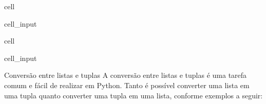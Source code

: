 \documentclass[letterpaper,10pt,english]{jupyterBook}
\begin{document}
\begin{sphinxuseclass}{cell}\begin{sphinxVerbatimInput}

\begin{sphinxuseclass}{cell_input}
\begin{sphinxVerbatim}[commandchars=\\\{\}]
  
  
\end{sphinxVerbatim}

\end{sphinxuseclass}\end{sphinxVerbatimInput}

\end{sphinxuseclass}
\begin{sphinxuseclass}{cell}\begin{sphinxVerbatimInput}

\begin{sphinxuseclass}{cell_input}
\begin{sphinxVerbatim}[commandchars=\\\{\}]
  
  
\end{sphinxVerbatim}

\end{sphinxuseclass}\end{sphinxVerbatimInput}

\end{sphinxuseclass}
\sphinxAtStartPar
Conversão entre listas e tuplas
A conversão entre listas e tuplas é uma tarefa comum e fácil de realizar em Python. Tanto é possível converter uma lista em uma tupla quanto converter uma tupla em uma lista, conforme exemplos a seguir:
\end{document}
